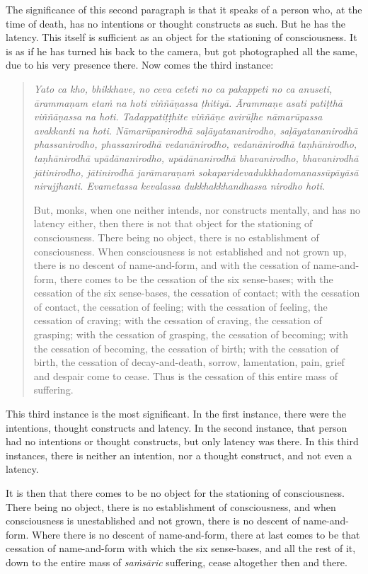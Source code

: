 The significance of this second paragraph is that it speaks of a person who, at the time of death, has no intentions or thought constructs as such. But he has the latency. This itself is sufficient as an object for the stationing of consciousness. It is as if he has turned his back to the camera, but got photographed all the same, due to his very presence there. Now comes the third instance:

\begin{quote}
\emph{Yato ca kho, bhikkhave, no ceva ceteti no ca pakappeti no ca anuseti, ārammaṇam etaṁ na hoti viññāṇassa ṭhitiyā. Ārammaṇe asati patiṭthā viññāṇassa na hoti. Tadappatiṭṭhite viññāṇe avirūḷhe nāmarūpassa avakkanti na hoti. Nāmarūpanirodhā saḷāyatananirodho, saḷāyatananirodhā phassanirodho, phassanirodhā vedanānirodho, vedanānirodhā taṇhānirodho, taṇhānirodhā upādānanirodho, upādānanirodhā bhavanirodho, bhavanirodhā jātinirodho, jātinirodhā jarāmaraṇaṁ sokaparidevadukkhadomanassūpāyāsā nirujjhanti. Evametassa kevalassa dukkhakkhandhassa nirodho hoti}.

But, monks, when one neither intends, nor constructs mentally, and has no latency either, then there is not that object for the stationing of consciousness. There being no object, there is no establishment of consciousness. When consciousness is not established and not grown up, there is no descent of name-and-form, and with the cessation of name-and-form, there comes to be the cessation of the six sense-bases; with the cessation of the six sense-bases, the cessation of contact; with the cessation of contact, the cessation of feeling; with the cessation of feeling, the cessation of craving; with the cessation of craving, the cessation of grasping; with the cessation of grasping, the cessation of becoming; with the cessation of becoming, the cessation of birth; with the cessation of birth, the cessation of decay-and-death, sorrow, lamentation, pain, grief and despair come to cease. Thus is the cessation of this entire mass of suffering.
\end{quote}

This third instance is the most significant. In the first instance, there were the intentions, thought constructs and latency. In the second instance, that person had no intentions or thought constructs, but only latency was there. In this third instances, there is neither an intention, nor a thought construct, and not even a latency.

It is then that there comes to be no object for the stationing of consciousness. There being no object, there is no establishment of consciousness, and when consciousness is unestablished and not grown, there is no descent of name-and-form. Where there is no descent of name-and-form, there at last comes to be that cessation of name-and-form with which the six sense-bases, and all the rest of it, down to the entire mass of \emph{saṁsāric} suffering, cease altogether then and there.
